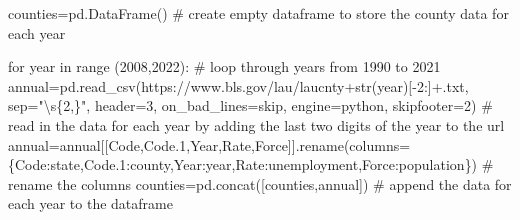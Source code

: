 \documentclass[
  letterpaper,
  DIV=11,
  numbers=noendperiod]{scrreprt}
\newenvironment{Shaded}{\begin{snugshade}}{\end{snugshade}}
\newcommand{\BuiltInTok}[1]{\textcolor[rgb]{0.00,0.23,0.31}{#1}}
\newcommand{\CommentTok}[1]{\textcolor[rgb]{0.37,0.37,0.37}{#1}}
\newcommand{\ControlFlowTok}[1]{\textcolor[rgb]{0.00,0.23,0.31}{#1}}
\newcommand{\DecValTok}[1]{\textcolor[rgb]{0.68,0.00,0.00}{#1}}
\newcommand{\KeywordTok}[1]{\textcolor[rgb]{0.00,0.23,0.31}{#1}}
\newcommand{\NormalTok}[1]{\textcolor[rgb]{0.00,0.23,0.31}{#1}}
\newcommand{\OperatorTok}[1]{\textcolor[rgb]{0.37,0.37,0.37}{#1}}
\newcommand{\StringTok}[1]{\textcolor[rgb]{0.13,0.47,0.30}{#1}}
\begin{document}
\begin{Shaded}
\begin{Highlighting}[]
\NormalTok{counties}\OperatorTok{=}\NormalTok{pd.DataFrame() }\CommentTok{\# create empty dataframe to store the county data for each year}

\ControlFlowTok{for}\NormalTok{ year }\KeywordTok{in} \BuiltInTok{range}\NormalTok{ (}\DecValTok{2008}\NormalTok{,}\DecValTok{2022}\NormalTok{): }\CommentTok{\# loop through years from 1990 to 2021}
\NormalTok{    annual}\OperatorTok{=}\NormalTok{pd.read\_csv(}\StringTok{\textquotesingle{}https://www.bls.gov/lau/laucnty\textquotesingle{}}\OperatorTok{+}\BuiltInTok{str}\NormalTok{(year)[}\OperatorTok{{-}}\DecValTok{2}\NormalTok{:]}\OperatorTok{+}\StringTok{\textquotesingle{}.txt\textquotesingle{}}\NormalTok{, sep}\OperatorTok{=}\StringTok{"\textbackslash{}s\{2,\}"}\NormalTok{, header}\OperatorTok{=}\DecValTok{3}\NormalTok{, on\_bad\_lines}\OperatorTok{=}\StringTok{\textquotesingle{}skip\textquotesingle{}}\NormalTok{, engine}\OperatorTok{=}\StringTok{\textquotesingle{}python\textquotesingle{}}\NormalTok{, skipfooter}\OperatorTok{=}\DecValTok{2}\NormalTok{) }\CommentTok{\# read in the data for each year by adding the last two digits of the year to the url}
\NormalTok{    annual}\OperatorTok{=}\NormalTok{annual[[}\StringTok{\textquotesingle{}Code\textquotesingle{}}\NormalTok{,}\StringTok{\textquotesingle{}Code.1\textquotesingle{}}\NormalTok{,}\StringTok{\textquotesingle{}Year\textquotesingle{}}\NormalTok{,}\StringTok{\textquotesingle{}Rate\textquotesingle{}}\NormalTok{,}\StringTok{\textquotesingle{}Force\textquotesingle{}}\NormalTok{]].rename(columns}\OperatorTok{=}\NormalTok{\{}\StringTok{\textquotesingle{}Code\textquotesingle{}}\NormalTok{:}\StringTok{\textquotesingle{}state\textquotesingle{}}\NormalTok{,}\StringTok{\textquotesingle{}Code.1\textquotesingle{}}\NormalTok{:}\StringTok{\textquotesingle{}county\textquotesingle{}}\NormalTok{,}\StringTok{\textquotesingle{}Year\textquotesingle{}}\NormalTok{:}\StringTok{\textquotesingle{}year\textquotesingle{}}\NormalTok{,}\StringTok{\textquotesingle{}Rate\textquotesingle{}}\NormalTok{:}\StringTok{\textquotesingle{}unemployment\textquotesingle{}}\NormalTok{,}\StringTok{\textquotesingle{}Force\textquotesingle{}}\NormalTok{:}\StringTok{\textquotesingle{}population\textquotesingle{}}\NormalTok{\}) }\CommentTok{\# rename the columns}
\NormalTok{    counties}\OperatorTok{=}\NormalTok{pd.concat([counties,annual]) }\CommentTok{\# append the data for each year to the dataframe}


\end{Highlighting}
\end{Shaded}
\end{document}
